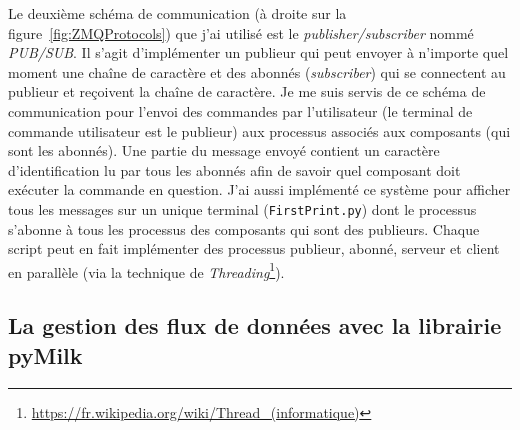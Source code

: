 Le deuxième schéma de communication (à droite sur la figure~\ref{fig:ZMQProtocols}) que j'ai utilisé est le \textit{publisher/subscriber} nommé \textit{PUB/SUB}. Il s'agit d'implémenter un publieur qui peut envoyer à n'importe quel moment une chaîne de caractère et des abonnés (\textit{subscriber}) qui se connectent au publieur et reçoivent la chaîne de caractère. Je me suis servis de ce schéma de communication pour l'envoi des commandes par l'utilisateur (le terminal de commande utilisateur est le publieur) aux processus associés aux composants (qui sont les abonnés). Une partie du message envoyé contient un caractère d'identification lu par tous les abonnés afin de savoir quel composant doit exécuter la commande en question. J'ai aussi implémenté ce système pour afficher tous les messages sur un unique terminal (\texttt{FirstPrint.py}) dont le processus s'abonne à tous les processus des composants qui sont des publieurs. Chaque script peut en fait implémenter des processus publieur, abonné, serveur et client en parallèle (via la technique de \textit{Threading}\footnote{\url{https://fr.wikipedia.org/wiki/Thread_(informatique)}}).


\subsection{La gestion des flux de données avec la librairie pyMilk}
\label{sec:SHM}



